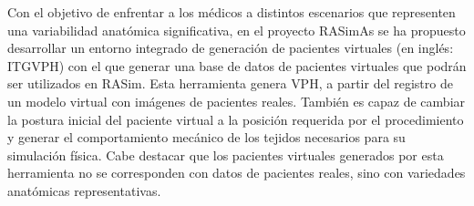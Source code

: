 Con el objetivo de enfrentar a los médicos a distintos escenarios que representen una variabilidad anatómica significativa, en el proyecto \ac{RASimAs} se ha propuesto desarrollar un entorno integrado de generación de pacientes virtuales (en inglés: \ac{ITGVPH}) con el que generar una base de datos de pacientes virtuales  que  podrán ser utilizados en \ac{RASim}. 
%
Esta herramienta genera \ac{VPH}, a partir del registro de un modelo virtual con imágenes de pacientes reales.
También es capaz de cambiar la postura inicial del paciente virtual a la posición requerida por el procedimiento y generar el comportamiento mecánico de los tejidos necesarios para su simulación física. Cabe destacar que los pacientes virtuales generados por esta herramienta no se corresponden con datos de pacientes reales, sino con variedades anatómicas representativas.








